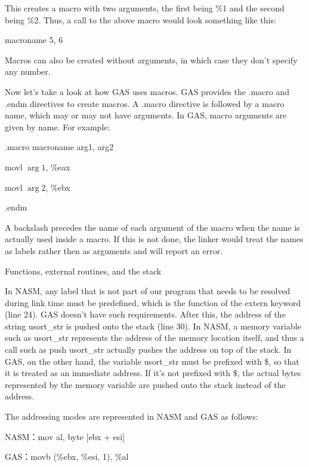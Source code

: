 \begin{flushleft}
This creates a macro with two arguments, the first being \%1 and the second being \%2. Thus, a call to the above macro would look something like this:

\quad macroname 5, 6

Macros can also be created without arguments, in which case they don't specify any number.

Now let's take a look at how GAS uses macros. GAS provides the .macro and .endm directives to create macros. A .macro directive is followed by a macro name, which may or may not have arguments. In GAS, macro arguments are given by name. For example:

\quad .macro macroname arg1, arg2

   \quad movl $\arg1$, \%eax

   \quad movl $\arg2$, \%ebx

\quad .endm

A backslash precedes the name of each argument of the macro when the name is actually used inside a macro. If this is not done, the linker would treat the names as labels rather then as arguments and will report an error.

\medskip
{\large Functions, external routines, and the stack}

In NASM, any label that is not part of our program that needs to be resolved during link time must be predefined, which is the function of the extern keyword (line 24). GAS doesn't have such requirements. After this, the address of the string usort\_str is pushed onto the stack (line 30). In NASM, a memory variable such as usort\_str represents the address of the memory location itself, and thus a call such as push usort\_str actually pushes the address on top of the stack. In GAS, on the other hand, the variable usort\_str must be prefixed with \$, so that it is treated as an immediate address. If it's not prefixed with \$, the actual bytes represented by the memory variable are pushed onto the stack instead of the address.

The addressing modes are represented in NASM and GAS as follows:

\quad NASM：mov al, byte [ebx + esi]

\quad GAS：movb (\%ebx, \%esi, 1), \%al
\end{flushleft}

